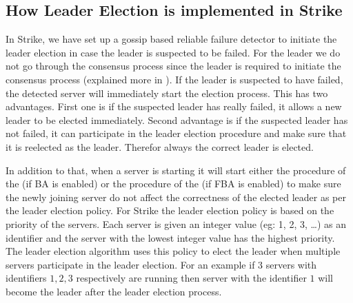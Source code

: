\documentclass[dareport.tex]{subfiles}
\begin{document}
\subsection{How Leader Election is implemented in Strike}
In Strike, we have set up a gossip based reliable failure detector to initiate the leader election in case the leader is suspected to be failed. For the leader we do not go through the consensus process since the leader is required to initiate the consensus process (explained more in ). If the leader is suspected to have failed, the detected server will immediately start the election process. This has two advantages. First one is if the suspected leader has really failed, it allows a new leader to be elected immediately. Second advantage is if the suspected leader has not failed, it can participate in the leader election procedure and make sure that it is reelected as the leader. Therefor always the correct leader is elected. 

In addition to that, when a server is starting it will start either the  procedure of the  (if BA is enabled) or the  procedure of the  (if FBA is enabled) to make sure the newly joining server do not affect the correctness of the elected leader as per the leader election policy. For Strike the leader election policy is based on the priority of the servers. Each server is given an integer value (eg: 1, 2, 3, \dots) as an identifier and the server with the lowest integer value has the highest priority. The leader election algorithm uses this policy to elect the leader when multiple servers participate in the leader election. For an example if 3 servers with identifiers $ 1, 2, 3 $ respectively are running then server with the identifier $ 1 $ will become the leader after the leader election process.
\end{document}
